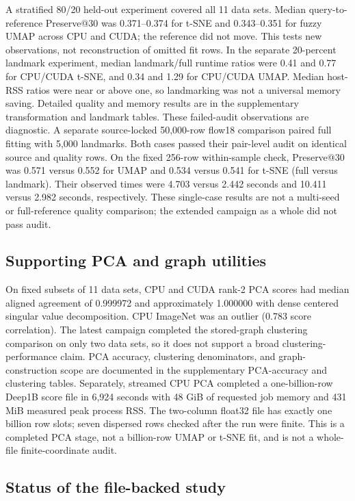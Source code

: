 \documentclass[article]{jss}
\begin{document}
A stratified 80/20 held-out experiment covered all 11 data sets. Median
query-to-reference Preserve@30 was 0.371--0.374 for t-SNE and
0.343--0.351 for fuzzy UMAP across CPU and CUDA; the reference did not move.
This tests new observations, not reconstruction of omitted fit rows.
In the separate 20-percent landmark experiment, median landmark/full
runtime ratios were 0.41 and 0.77 for CPU/CUDA t-SNE, and 0.34 and 1.29 for
CPU/CUDA UMAP. Median host-RSS ratios were near or above one, so
landmarking was not a universal memory saving. Detailed quality and memory
results are in the supplementary transformation and landmark tables. These
failed-audit observations are diagnostic. A separate source-locked
50,000-row flow18 comparison paired full fitting with 5,000 landmarks.
Both cases passed their pair-level audit on identical source and quality
rows. On the fixed 256-row within-sample check, Preserve@30 was 0.571
versus 0.552 for UMAP and 0.534 versus 0.541 for t-SNE (full versus
landmark). Their observed times were 4.703 versus 2.442 seconds and
10.411 versus 2.982 seconds, respectively. These single-case results
are not a multi-seed or full-reference quality comparison; the extended
campaign as a whole did not pass audit.

\subsection{Supporting PCA and graph utilities}

On fixed subsets of 11 data sets, CPU and CUDA rank-2 PCA scores had
median aligned agreement of 0.999972 and approximately 1.000000 with
dense centered singular value decomposition. CPU ImageNet was an outlier
(0.783 score correlation). The latest campaign completed the
stored-graph clustering comparison on only two data sets, so it does not
support a broad clustering-performance claim. PCA accuracy, clustering
denominators, and graph-construction scope are documented in the
supplementary PCA-accuracy and clustering tables.
Separately, streamed CPU PCA completed a one-billion-row Deep1B score file
in 6,924 seconds with 48 GiB of requested job memory and 431 MiB measured
peak process RSS. The two-column float32 file has exactly one billion row
slots; seven dispersed rows checked after the run were finite. This is a
completed PCA stage, not a billion-row UMAP or t-SNE fit, and is not a
whole-file finite-coordinate audit.

\subsection{Status of the file-backed study}
\end{document}

